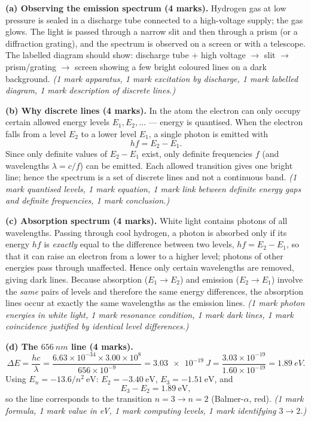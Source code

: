 \documentclass[11pt]{article}
\newcommand{\cle}[1]{{\popxbold\color{popdark}#1}}
\begin{document}
\begin{corrige}
\textbf{(a) Observing the emission spectrum (4 marks).} Hydrogen gas at low pressure is sealed in a discharge tube connected to a high-voltage supply; the gas glows. The light is passed through a narrow slit and then through a prism (or a diffraction grating), and the spectrum is observed on a screen or with a telescope. The labelled diagram should show: discharge tube + high voltage $\to$ slit $\to$ prism/grating $\to$ screen showing a few bright coloured lines on a dark background. \emph{(1 mark apparatus, 1 mark excitation by discharge, 1 mark labelled diagram, 1 mark description of discrete lines.)}

\textbf{(b) Why discrete lines (4 marks).} In the atom the electron can only occupy certain allowed energy levels $E_1, E_2, \dots$ — energy is \cle{quantised}. When the electron falls from a level $E_2$ to a lower level $E_1$, a single photon is emitted with
\[ hf = E_2 - E_1. \]
Since only definite values of $E_2 - E_1$ exist, only definite frequencies $f$ (and wavelengths $\lambda = c/f$) can be emitted. Each allowed transition gives one bright line; hence the spectrum is a set of discrete lines and not a continuous band. \emph{(1 mark quantised levels, 1 mark equation, 1 mark link between definite energy gaps and definite frequencies, 1 mark conclusion.)}

\textbf{(c) Absorption spectrum (4 marks).} White light contains photons of all wavelengths. Passing through cool hydrogen, a photon is absorbed only if its energy $hf$ is \emph{exactly} equal to the difference between two levels, $hf = E_2 - E_1$, so that it can raise an electron from a lower to a higher level; photons of other energies pass through unaffected. Hence only certain wavelengths are removed, giving dark lines. Because absorption ($E_1 \to E_2$) and emission ($E_2 \to E_1$) involve the \emph{same} pairs of levels and therefore the same energy differences, the absorption lines occur at exactly the same wavelengths as the emission lines. \emph{(1 mark photon energies in white light, 1 mark resonance condition, 1 mark dark lines, 1 mark coincidence justified by identical level differences.)}

\textbf{(d) The $\SI{656}{nm}$ line (4 marks).}
\[ \Delta E = \frac{hc}{\lambda} = \frac{6.63\times 10^{-34} \times 3.00\times 10^{8}}{656\times 10^{-9}} = \SI{3.03e-19}{J} = \frac{3.03\times 10^{-19}}{1.60\times 10^{-19}} = \boxed{\SI{1.89}{eV}}. \]
Using $E_n = -13.6/n^{2}\ \mathrm{eV}$: $E_2 = -3.40\ \mathrm{eV}$, $E_3 = -1.51\ \mathrm{eV}$, and
\[ E_3 - E_2 = 1.89\ \mathrm{eV}, \]
so the line corresponds to the transition $\boxed{n = 3 \rightarrow n = 2}$ (Balmer-$\alpha$, red). \emph{(1 mark formula, 1 mark value in eV, 1 mark computing levels, 1 mark identifying $3 \to 2$.)}
\end{corrige}
\end{document}
